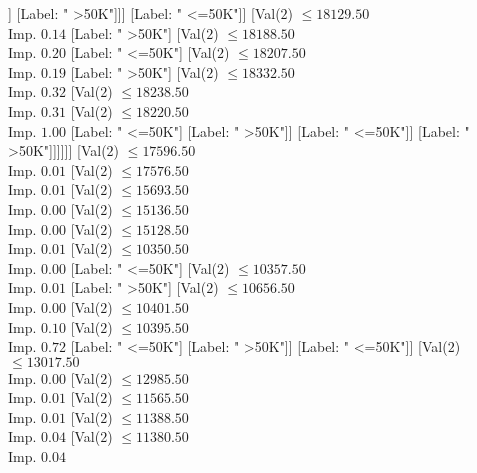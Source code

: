 \documentclass[margin=10pt]{standalone}
\begin{document}
\begin{forest}
																	[Label: " <=50K"]]
																[Label: " >50K"]]]
														[Label: " <=50K"]]
													[Val($2$) $ \leq 18129.50$ \\ Imp. $0.14$
														[Label: " >50K"]
														[Val($2$) $ \leq 18188.50$ \\ Imp. $0.20$
															[Label: " <=50K"]
															[Val($2$) $ \leq 18207.50$ \\ Imp. $0.19$
																[Label: " >50K"]
																[Val($2$) $ \leq 18332.50$ \\ Imp. $0.32$
																	[Val($2$) $ \leq 18238.50$ \\ Imp. $0.31$
																		[Val($2$) $ \leq 18220.50$ \\ Imp. $1.00$
																			[Label: " <=50K"]
																			[Label: " >50K"]]
																		[Label: " <=50K"]]
																	[Label: " >50K"]]]]]]
												[Val($2$) $ \leq 17596.50$ \\ Imp. $0.01$
													[Val($2$) $ \leq 17576.50$ \\ Imp. $0.01$
														[Val($2$) $ \leq 15693.50$ \\ Imp. $0.00$
															[Val($2$) $ \leq 15136.50$ \\ Imp. $0.00$
																[Val($2$) $ \leq 15128.50$ \\ Imp. $0.01$
																	[Val($2$) $ \leq 10350.50$ \\ Imp. $0.00$
																		[Label: " <=50K"]
																		[Val($2$) $ \leq 10357.50$ \\ Imp. $0.01$
																			[Label: " >50K"]
																			[Val($2$) $ \leq 10656.50$ \\ Imp. $0.00$
																				[Val($2$) $ \leq 10401.50$ \\ Imp. $0.10$
																					[Val($2$) $ \leq 10395.50$ \\ Imp. $0.72$
																						[Label: " <=50K"]
																						[Label: " >50K"]]
																					[Label: " <=50K"]]
																				[Val($2$) $ \leq 13017.50$ \\ Imp. $0.00$
																					[Val($2$) $ \leq 12985.50$ \\ Imp. $0.01$
																						[Val($2$) $ \leq 11565.50$ \\ Imp. $0.01$
																							[Val($2$) $ \leq 11388.50$ \\ Imp. $0.04$
																								[Val($2$) $ \leq 11380.50$ \\ Imp. $0.04$

\end{forest}
\end{document}
